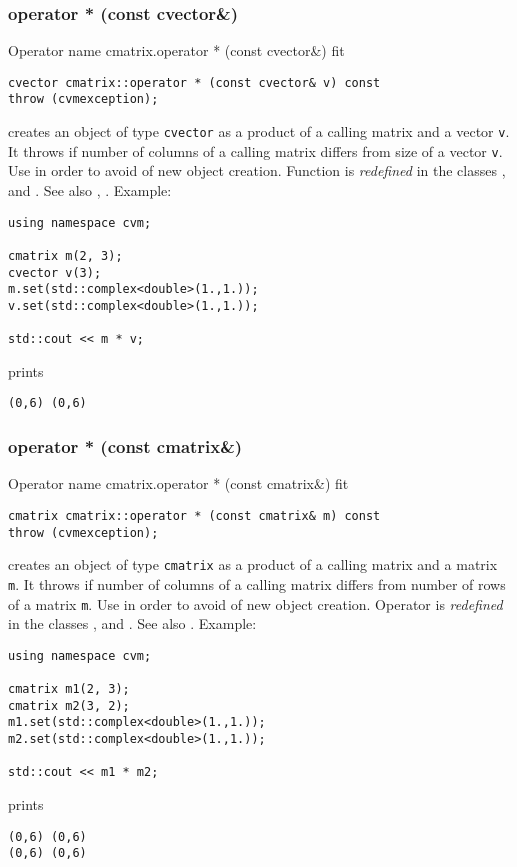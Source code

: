 \subsubsection{operator * (const cvector\&)}
Operator%
\pdfdest name {cmatrix.operator * (const cvector&)} fit
\begin{verbatim}
cvector cmatrix::operator * (const cvector& v) const
throw (cvmexception);
\end{verbatim}
creates an object of type \verb"cvector"
as a product of a calling matrix and a vector \verb"v".
It throws  
if number of columns of a calling matrix
differs from size of a vector \verb"v".
Use 
in order to avoid of  new object creation.
Function is \emph{redefined} in the classes
,  
and .
See also
, .
Example:
\begin{Verbatim}
using namespace cvm;

cmatrix m(2, 3);
cvector v(3);
m.set(std::complex<double>(1.,1.));
v.set(std::complex<double>(1.,1.));

std::cout << m * v;
\end{Verbatim}
prints
\begin{Verbatim}
(0,6) (0,6)
\end{Verbatim}
\newpage



\subsubsection{operator * (const cmatrix\&)}
Operator%
\pdfdest name {cmatrix.operator * (const cmatrix&)} fit
\begin{verbatim}
cmatrix cmatrix::operator * (const cmatrix& m) const
throw (cvmexception);
\end{verbatim}
creates an object of type \verb"cmatrix"
as a product of a calling matrix and a matrix \verb"m".
It throws  
if number of columns of a calling matrix
differs from number of rows of a matrix \verb"m".
Use  in order to avoid of
 new object creation.
Operator is \emph{redefined} in the classes
,  
and .
See also
.
Example:
\begin{Verbatim}
using namespace cvm;

cmatrix m1(2, 3);
cmatrix m2(3, 2);
m1.set(std::complex<double>(1.,1.));
m2.set(std::complex<double>(1.,1.));

std::cout << m1 * m2;
\end{Verbatim}
prints
\begin{Verbatim}
(0,6) (0,6)
(0,6) (0,6)
\end{Verbatim}
\newpage



